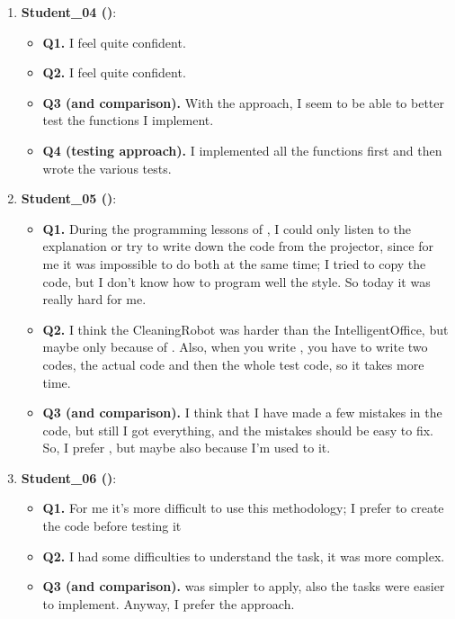 \begin{enumerate}
    \item \textbf{Student\_04 (\notdd)}:
    \begin{itemize}
        \item \textbf{Q1.} I feel quite confident.
        \item \textbf{Q2.} I feel quite confident.
        \item \textbf{Q3 (\tdd and \notdd comparison).} With the \notdd approach, I seem to be able to better test the functions I implement. 
        \item \textbf{Q4 (\notdd testing approach).} I implemented all the functions first and then wrote the various tests. 
    \end{itemize}

    \item \textbf{Student\_05 (\tdd)}:
    \begin{itemize}
        \item \textbf{Q1.} During the programming lessons of \tdd, I could only listen to the explanation or try to write down the code from the projector, since for me it was impossible to do both at the same time; I tried to copy the code, but I don't know how to program well the \tdd style. So today it was really hard for me.
        \item \textbf{Q2.} I think the CleaningRobot was harder than the IntelligentOffice, but maybe only because of \tdd. Also, when you write \tdd, you have to write two codes, the actual code and then the whole test code, so it takes more time.
        \item \textbf{Q3 (\tdd and \notdd comparison).} I think that I have made a few mistakes in the \notdd code, but still I got everything, and the mistakes should be easy to fix. So, I prefer \notdd, but maybe also because I'm used to it.
    \end{itemize}

    \item \textbf{Student\_06 (\tdd)}:
    \begin{itemize}
        \item \textbf{Q1.} For me it's more difficult to use this methodology; I prefer to create the code before testing it   
        \item \textbf{Q2.} I had some difficulties to understand the task, it was more complex. 
        \item \textbf{Q3 (\tdd and \notdd comparison).} \notdd was simpler to apply, also the tasks were easier to implement. Anyway, I prefer the \notdd approach.
    \end{itemize}


\end{enumerate}
